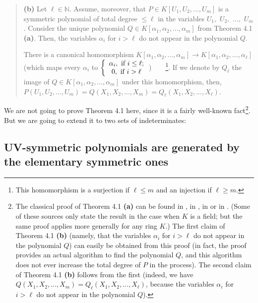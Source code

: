 \documentclass[numbers=enddot,12pt,final,onecolumn,notitlepage]{scrartcl}%
\begin{document}
\begin{quote}
\textbf{(b)} Let $\ell\in\mathbb{N}$. Assume, moreover, that $P\in K\left[
U_{1},U_{2},...,U_{m}\right]  $ is a symmetric polynomial of total degree
$\leq\ell$ in the variables $U_{1},$ $U_{2},$ $...,$ $U_{m}$. Consider the
unique polynomial $Q\in K\left[  \alpha_{1},\alpha_{2},...,\alpha_{m}\right]
$ from Theorem 4.1 \textbf{(a)}. Then, the variables $\alpha_{i}$ for $i>\ell$
do not appear in the polynomial $Q$.

There is a canonical homomorphism $K\left[  \alpha_{1},\alpha_{2}%
,...,\alpha_{m}\right]  \rightarrow K\left[  \alpha_{1},\alpha_{2}%
,...,\alpha_{\ell}\right]  $ (which maps every $\alpha_{i}$ to $\left\{
\begin{array}
[c]{c}%
\alpha_{i},\text{ if }i\leq\ell;\\
0,\text{ if }i>\ell
\end{array}
\right.  $)\ \ \ \ \footnote{This homomorphism is a surjection if $\ell\leq m$
and an injection if $\ell\geq m$.}. If we denote by $Q_{\ell}$ the image of
$Q\in K\left[  \alpha_{1},\alpha_{2},...,\alpha_{m}\right]  $ under this
homomorphism, then, $P\left(  U_{1},U_{2},...,U_{m}\right)  =Q\left(
X_{1},X_{2},...,X_{m}\right)  =Q_{\ell}\left(  X_{1},X_{2},...,X_{\ell
}\right)  $.
\end{quote}

We are not going to prove Theorem 4.1 here, since it is a fairly well-known
fact\footnote{The classical proof of Theorem 4.1 \textbf{(a)} can be found in
\cite[proof of Theorem 1]{BluCos16}, in \cite[Remark 4.16]{Neusel07}, in
\cite[\S 1.1]{Smith95} or in \cite[Chapter 7, \S 1, proof of Theorem
3]{CoLiOS15}. (Some of these sources only state the result in the case when
$K$ is a field; but the same proof applies more generally for any ring $K$.)
The first claim of Theorem 4.1 \textbf{(b)} (namely, that the variables
$\alpha_{i}$ for $i>\ell$ do not appear in the polynomial $Q$) can easily be
obtained from this proof (in fact, the proof provides an actual algorithm to
find the polynomial $Q$, and this algorithm does not ever increase the total
degree of $P$ in the process). The second claim of Theorem 4.1 \textbf{(b)}
follows from the first (indeed, we have $Q\left(  X_{1},X_{2},...,X_{m}%
\right)  =Q_{\ell}\left(  X_{1},X_{2},...,X_{\ell}\right)  $, because the
variables $\alpha_{i}$ for $i>\ell$ do not appear in the polynomial $Q$).}.
But we are going to extend it to two sets of indeterminates:

\subsection{UV-symmetric polynomials are generated by the elementary symmetric
ones}
\end{document}
